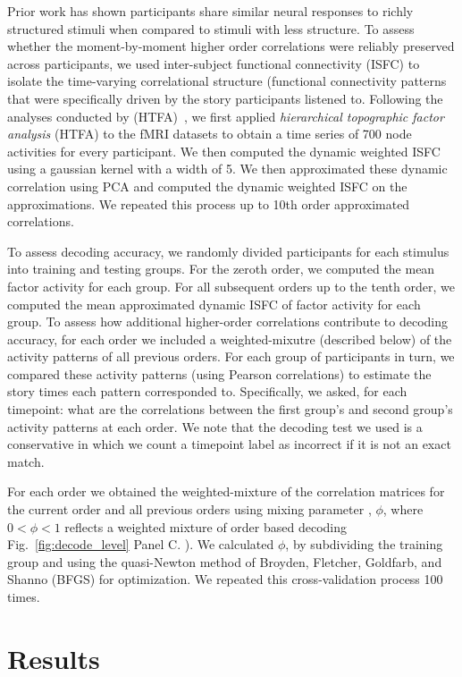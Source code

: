 \documentclass[english]{article}
\begin{document}
Prior work has shown participants share similar neural responses to
richly structured stimuli when compared to stimuli with less
structure.  To assess whether the moment-by-moment higher order
correlations were reliably preserved across participants, we used
inter-subject functional connectivity (ISFC) to isolate the
time-varying correlational structure (functional connectivity patterns
that were specifically driven by the story participants listened to.
Following the analyses conducted by (HTFA)~\cite{MannEtal18}, we first
applied \textit{hierarchical topographic factor analysis} (HTFA) to the fMRI datasets to obtain a time series of 700 node activities for every participant.  We then computed the dynamic weighted ISFC using a gaussian kernel with a width of 5. We then approximated these dynamic correlation using PCA and computed the dynamic weighted ISFC on the approximations.  We repeated this process up to 10th order approximated correlations.  

To assess decoding accuracy, we randomly divided participants for each
stimulus into training and testing groups. For the zeroth order, we
computed the mean factor activity for each group.  For all subsequent
orders up to the tenth order, we computed the mean approximated
dynamic ISFC of factor activity for each group. To assess how
additional higher-order correlations contribute to decoding accuracy,
for each order we included a weighted-mixutre (described below) of the activity patterns of all
previous orders.  For each group of participants in turn, we compared these activity patterns (using Pearson correlations) to estimate the story times each pattern corresponded to. Specifically, we asked, for each timepoint: what are the correlations
between the first group's and second group's activity patterns at each
order. We note that the decoding test we used is a conservative in which we count a timepoint label as incorrect if it is not an exact match.

For each order we obtained the weighted-mixture of the correlation
matrices for the current order and all previous orders using mixing parameter , $\phi$, where $0 <\phi< 1$ reflects a
weighted mixture of order based decoding Fig.~\ref{fig:decode_level}
Panel C. ). We calculated  $\phi$, by
subdividing the training group and using the quasi-Newton method of
Broyden, Fletcher, Goldfarb, and Shanno (BFGS) for optimization. We
repeated this cross-validation process 100 times. 



\section*{Results}
\end{document}
